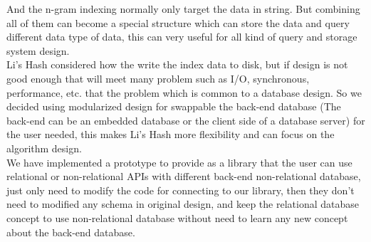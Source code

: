 And the n-gram indexing normally only target the data in string. But combining all of them can become a special structure which can store the data and query different data type of data, this can very useful for all kind of query and storage system design.\\

Li's Hash considered how the write the index data to disk, but if design is not good enough that will meet many problem such as I/O, synchronous, performance, etc. that the problem which is common to a database design. So we decided using modularized design for swappable the back-end database (The back-end can be an embedded database or the client side of a database server) for the user needed, this makes Li's Hash more flexibility and can focus on the algorithm design.\\

We have implemented a prototype to provide as a library \cite{web:lishash:home-page} that the user can use relational or non-relational APIs with different back-end non-relational database, just only need to modify the code for connecting to our library, then they don't need to modified any schema in original design, and keep the relational database concept to use non-relational database without need to learn any new concept about the back-end database.\\

\clearpage

